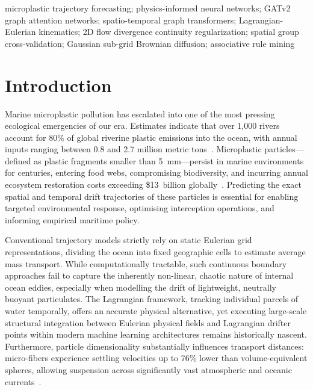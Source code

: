 \documentclass[conference]{IEEEtran}
\begin{document}
\begin{IEEEkeywords}
microplastic trajectory forecasting; physics-informed neural networks;
GATv2 graph attention networks; spatio-temporal graph transformers;
Lagrangian-Eulerian kinematics; 2D flow divergence continuity regularization;
spatial group cross-validation; Gaussian sub-grid Brownian diffusion; associative rule mining
\end{IEEEkeywords}


\section{Introduction}

Marine microplastic pollution has escalated into one of the most pressing ecological emergencies of our era. Estimates indicate that over 1,000 rivers account for 80\% of global riverine plastic emissions into the ocean, with annual inputs ranging between 0.8 and 2.7 million metric tons~\cite{ref7}. Microplastic particles---defined as plastic fragments smaller than 5~mm---persist in marine environments for centuries, entering food webs, compromising biodiversity, and incurring annual ecosystem restoration costs exceeding \$13~billion globally~\cite{ref1}. Predicting the exact spatial and temporal drift trajectories of these particles is essential for enabling targeted environmental response, optimising interception operations, and informing empirical maritime policy.

Conventional trajectory models strictly rely on static Eulerian grid representations, dividing the ocean into fixed geographic cells to estimate average mass transport. While computationally tractable, such continuous boundary approaches fail to capture the inherently non-linear, chaotic nature of internal ocean eddies, especially when modelling the drift of lightweight, neutrally buoyant particulates. The Lagrangian framework, tracking individual parcels of water temporally, offers an accurate physical alternative, yet executing large-scale structural integration between Eulerian physical fields and Lagrangian drifter points within modern machine learning architectures remains historically nascent. Furthermore, particle dimensionality substantially influences transport distances: micro-fibers experience settling velocities up to 76\% lower than volume-equivalent spheres, allowing suspension across significantly vast atmospheric and oceanic currents~\cite{ref6}.
\end{document}
